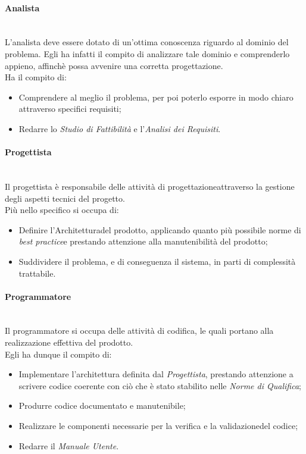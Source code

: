 \paragraph{Analista} ~\\
	L'analista deve essere dotato di un'ottima conoscenza riguardo al dominio del problema. Egli ha infatti il 					compito di analizzare tale dominio e comprenderlo appieno, affinchè possa avvenire una corretta 											progettazione\glossario.\\
	Ha il compito di:
	\begin{itemize}
	\item Comprendere al meglio il problema, per poi poterlo esporre in modo chiaro attraverso specifici 									requisiti\glossario;
	\item Redarre lo \textit{Studio di Fattibilità} e l'\textit{Analisi dei Requisiti}\glossario.
	\end{itemize}

\paragraph{Progettista} ~\\
	Il progettista è responsabile delle attività di progettazione\glossario attraverso la gestione degli aspetti tecnici 	del progetto.\\
	Più nello specifico si occupa di:
	\begin{itemize}
	\item Definire l'Architettura\glossario del prodotto\glossario, applicando quanto più possibile norme di 							\textit{best practice}\glossario e prestando attenzione alla manutenibilità del prodotto;
	\item Suddividere il problema, e di conseguenza il sistema, in parti di complessità trattabile.
	\end{itemize}

\paragraph{Programmatore} ~\\
	Il programmatore si occupa delle attività di codifica, le quali portano alla realizzazione effettiva del 						prodotto.\\
	Egli ha dunque il compito di:
	\begin{itemize}
	\item Implementare l'architettura definita dal \textit{Progettista}, prestando attenzione a scrivere codice 						coerente con ciò che è stato stabilito nelle \textit{Norme di Qualifica};
	\item Produrre codice documentato e manutenibile;
	\item Realizzare le componenti necessarie per la verifica e la validazione\glossario del codice;
	\item Redarre il \textit{Manuale Utente}.
	\end{itemize}

